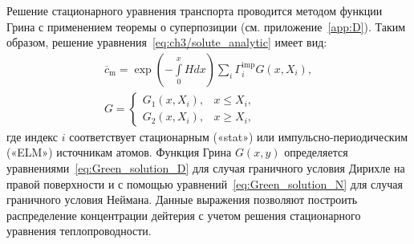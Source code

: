 Решение стационарного уравнения транспорта проводится методом функции Грина с применением теоремы о суперпозиции (см. приложение~\cref{app:D}). Таким образом, решение уравнения~\cref{eq:ch3/solute_analytic} имеет вид:
\begin{subequations}
	\begin{gather}
		\label{eq:ss_solution}
		\overline{c}_{\mathrm{m}}= \exp\left(-\int\limits_0^x H dx \right) \sum \limits_{i} \Gamma_i^{\mathrm{imp}} G(x, X_i), \\
		G =
		\begin{cases}
			G_1(x, X_i), & x \leq X_i, \\
			G_2(x, X_i), & x \geq X_i,
		\end{cases}
	\end{gather}
\end{subequations}
где индекс \(i\) соответствует стационарным («stat») или импульсно-периодическим («ELM») источникам атомов. Функция Грина \( G(x,y) \) определяется уравнениями~\cref{eq:Green_solution_D} для случая граничного условия Дирихле на правой поверхности и с помощью уравнений~\cref{eq:Green_solution_N} для случая граничного условия Неймана. Данные выражения позволяют построить распределение концентрации дейтерия с учетом решения стационарного уравнения теплопроводности.

